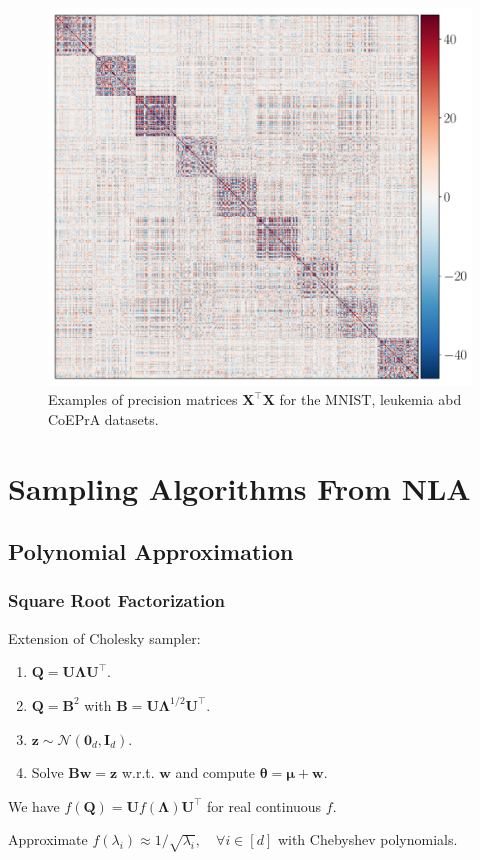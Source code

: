 \documentclass[aspectratio=169]{beamer}
\newcommand{\B}[1]{\mathbf{#1}} %
\newcommand{\Bs}[1]{\boldsymbol{#1}} %
\begin{document}
\begin{frame}
\begin{figure}
    \mbox{{\includegraphics[scale=0.15]{src/images/Coepra_AA.pdf}}}
    \caption{Examples of precision matrices $\B{X}^{\top}\B{X}$ for the MNIST, leukemia abd CoEPrA datasets.}
    \label{fig:LASSO_example}
\end{figure}
\end{frame}

\section{Sampling Algorithms From NLA}
\subsection{Polynomial Approximation}
\begin{frame}
\frametitle{Square Root Factorization}
Extension of Cholesky sampler:
\begin{enumerate}
    \item $\B{Q} = \B{U}\B{\Lambda}\B{U^{\top}}$. 
    \item $\B{Q} = \B{B}^2$ with $\B{B} = \B{U}\B{\Lambda}^{1/2}\B{U^{\top}}$.\item $\B{z} \sim \mathcal{N}(\B{0}_d,\B{I}_d)$.
    \item Solve $\B{B}\B{w} = \B{z}$ w.r.t. $\B{w}$ and compute $\Bs{\theta} = \Bs{\mu} + \B{w}$.
\end{enumerate}
We have $f(\B{Q}) = \B{U}f(\B{\Lambda})\B{U}^{\top}$ for real continuous \(f\).

Approximate \(f(\lambda_i) \approx 1/\sqrt{\lambda_i}, \quad \forall i \in [d]\) with Chebyshev polynomials.
\end{frame}
\end{document}
